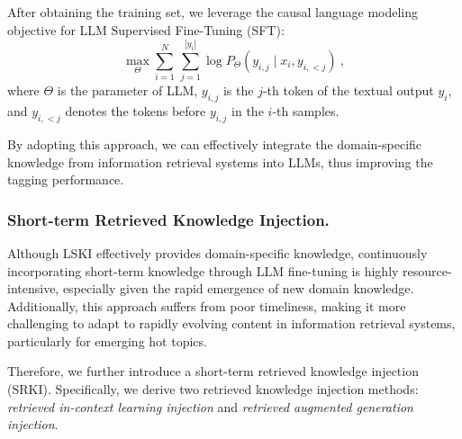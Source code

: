 After obtaining the training set, we leverage the causal language modeling objective for LLM Supervised Fine-Tuning (SFT):
\begin{equation}
    \max_{\Theta}\sum_{i=1}^N\, \sum_{j=1}^{|y_i|}\log P_{\Theta}\left(y_{i,j} \mid x_i,y_{i,<j}\right)~,
    \label{eq:loss}
\end{equation}
where $\Theta$ is the parameter of LLM, $y_{i,j}$ is the $j$-th token of the textual output $y_{i}$, and $y_{i,<j}$ denotes the tokens before $y_{i,j}$ in the $i$-th samples.

By adopting this approach, we can effectively integrate the domain-specific knowledge from information retrieval systems into LLMs, thus improving the tagging performance.


\subsubsection{Short-term Retrieved Knowledge Injection.} Although LSKI effectively provides domain-specific knowledge, continuously incorporating short-term knowledge through LLM fine-tuning is highly resource-intensive, especially given the rapid emergence of new domain knowledge.
Additionally, this approach suffers from poor timeliness, making it more challenging to adapt to rapidly evolving content in information retrieval systems, particularly for emerging hot topics.



Therefore, we further introduce a short-term retrieved knowledge injection (SRKI). 
Specifically, we derive two retrieved knowledge injection methods: \textit{retrieved in-context learning injection} and \textit{retrieved augmented generation injection}.


